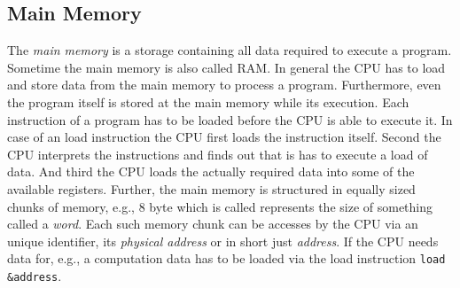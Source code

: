 \documentclass[onecolumn, openright, master, english, signatures]{dbrgrptt}
\begin{document}
\subsection{Main Memory}
The \emph{main memory} is a storage containing all data required to execute a program. Sometime the main memory is also called \ac{RAM}. In general the CPU has to load and store data from the main memory to process a program. Furthermore, even the program itself is stored at the main memory while its execution. Each instruction of a program has to be loaded before the \ac{CPU} is able to execute it. In case of an load instruction the \ac{CPU} first loads the instruction itself. Second the CPU interprets the instructions and finds out that is has to execute a load of data. And third the \ac{CPU} loads the actually required data into some of the available registers.
Further, the main memory is structured in equally sized chunks of memory, e.g., 8 byte which is called represents the size of something called a \emph{word}. Each such memory chunk can be accesses by the \ac{CPU} via an unique identifier, its \emph{physical address} or in short just \emph{address}. If the CPU needs data for, e.g., a computation data has to be loaded via the load instruction \texttt{load \&address}.
\end{document}
